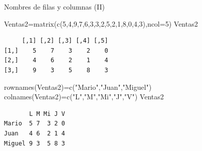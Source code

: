 \documentclass[
  ignorenonframetext,
  aspectratio=169,
  spanish,
]{beamer}
\newenvironment{Shaded}{\begin{snugshade}}{\end{snugshade}}
\newcommand{\AttributeTok}[1]{\textcolor[rgb]{0.40,0.45,0.13}{#1}}
\newcommand{\DecValTok}[1]{\textcolor[rgb]{0.68,0.00,0.00}{#1}}
\newcommand{\FunctionTok}[1]{\textcolor[rgb]{0.28,0.35,0.67}{#1}}
\newcommand{\NormalTok}[1]{\textcolor[rgb]{0.00,0.23,0.31}{#1}}
\newcommand{\OtherTok}[1]{\textcolor[rgb]{0.00,0.23,0.31}{#1}}
\newcommand{\StringTok}[1]{\textcolor[rgb]{0.13,0.47,0.30}{#1}}
\begin{document}
\begin{frame}[fragile]{Nombres de filas y columnas (II)}
\label{nombres-de-filas-y-columnas-ii}
\begin{Shaded}
\begin{Highlighting}[]
\NormalTok{Ventas2}\OtherTok{=}\FunctionTok{matrix}\NormalTok{(}\FunctionTok{c}\NormalTok{(}\DecValTok{5}\NormalTok{,}\DecValTok{4}\NormalTok{,}\DecValTok{9}\NormalTok{,}\DecValTok{7}\NormalTok{,}\DecValTok{6}\NormalTok{,}\DecValTok{3}\NormalTok{,}\DecValTok{3}\NormalTok{,}\DecValTok{2}\NormalTok{,}\DecValTok{5}\NormalTok{,}\DecValTok{2}\NormalTok{,}\DecValTok{1}\NormalTok{,}\DecValTok{8}\NormalTok{,}\DecValTok{0}\NormalTok{,}\DecValTok{4}\NormalTok{,}\DecValTok{3}\NormalTok{),}\AttributeTok{ncol=}\DecValTok{5}\NormalTok{)}
\NormalTok{Ventas2}
\end{Highlighting}
\end{Shaded}

\begin{verbatim}
     [,1] [,2] [,3] [,4] [,5]
[1,]    5    7    3    2    0
[2,]    4    6    2    1    4
[3,]    9    3    5    8    3
\end{verbatim}

\begin{Shaded}
\begin{Highlighting}[]
\FunctionTok{rownames}\NormalTok{(Ventas2)}\OtherTok{=}\FunctionTok{c}\NormalTok{(}\StringTok{"Mario"}\NormalTok{,}\StringTok{"Juan"}\NormalTok{,}\StringTok{"Miguel"}\NormalTok{)}
\FunctionTok{colnames}\NormalTok{(Ventas2)}\OtherTok{=}\FunctionTok{c}\NormalTok{(}\StringTok{"L"}\NormalTok{,}\StringTok{"M"}\NormalTok{,}\StringTok{"Mi"}\NormalTok{,}\StringTok{"J"}\NormalTok{,}\StringTok{"V"}\NormalTok{) }
\NormalTok{Ventas2}
\end{Highlighting}
\end{Shaded}

\begin{verbatim}
       L M Mi J V
Mario  5 7  3 2 0
Juan   4 6  2 1 4
Miguel 9 3  5 8 3
\end{verbatim}
\end{frame}
\end{document}
